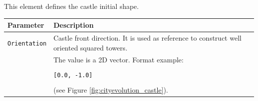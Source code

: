 \documentclass[tog]{acmsiggraph}
\begin{document}
This element defines the castle initial shape.

\begin{tabularx}{0.48\textwidth}{ |l|X| }
\hline 
\textbf{Parameter} & \textbf{Description} \\[0.15cm]
 \hline
  \texttt{Orientation} & Castle front direction. It is used as reference to construct well oriented squared towers. \\
  & The value is a 2D vector. Format example:  \\ 
   & \\
  & \quad\texttt{[0.0, -1.0]}\\
  & \\
  & (see Figure \ref{fig:cityevolution_castle}).\\
 \hline
\end{tabularx}  
 
\end{document}
